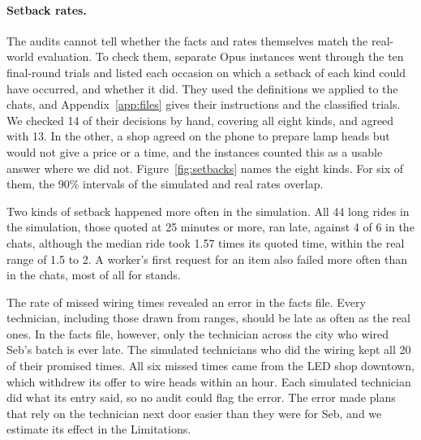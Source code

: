 \documentclass[10pt]{article}
\begin{document}
\paragraph{Setback rates.} The audits cannot tell whether the facts and rates themselves match the real-world evaluation. To check them, separate Opus instances went through the ten final-round trials and listed each occasion on which a setback of each kind could have occurred, and whether it did. They used the definitions we applied to the chats, and Appendix~\ref{app:files} gives their instructions and the classified trials. We checked 14 of their decisions by hand, covering all eight kinds, and agreed with 13. In the other, a shop agreed on the phone to prepare lamp heads but would not give a price or a time, and the instances counted this as a usable answer where we did not. Figure~\ref{fig:setbacks} names the eight kinds. For six of them, the 90\% intervals of the simulated and real rates overlap.

Two kinds of setback happened more often in the simulation. All 44 long rides in the simulation, those quoted at 25 minutes or more, ran late, against 4 of 6 in the chats, although the median ride took 1.57 times its quoted time, within the real range of 1.5 to 2. A worker's first request for an item also failed more often than in the chats, most of all for stands.

The rate of missed wiring times revealed an error in the facts file. Every technician, including those drawn from ranges, should be late as often as the real ones. In the facts file, however, only the technician across the city who wired Seb's batch is ever late. The simulated technicians who did the wiring kept all 20 of their promised times. All six missed times came from the LED shop downtown, which withdrew its offer to wire heads within an hour. Each simulated technician did what its entry said, so no audit
could flag the error. The error made plans that rely on
the technician next door easier than they were for Seb, and we estimate its effect in the Limitations.
\end{document}
